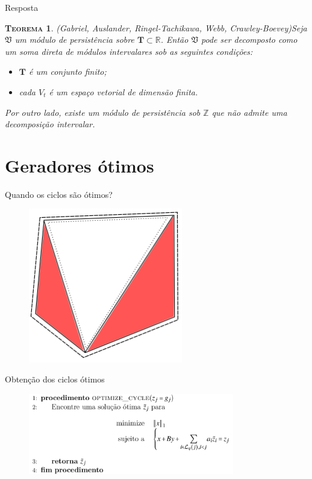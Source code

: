 \documentclass[10pt]{beamer}
\newtheorem{teo}{\scshape Teorema}
\begin{document}
\begin{frame}{Resposta}
    \begin{teo}{(Gabriel, Auslander, Ringel-Tachikawa, Webb, Crawley-Boevey)}\label{teo:crawley}
    Seja $\mathfrak{V}$ um módulo de persistência sobre $\mathbf{T} \subset \mathbb{R}$. Então $\mathfrak{V}$
    pode ser decomposto como um soma direta de módulos intervalares sob as seguintes condições:
    \begin{itemize} 
        \item $\mathbf{T}$ é um conjunto finito;
        \item cada $V_t$ é um espaço vetorial de dimensão finita. 
    \end{itemize}
    Por outro lado, existe um módulo de persistência sob $\mathbb{Z}$ que não admite uma decomposição intervalar. 
\end{teo}  
\end{frame}

\section{Geradores ótimos} 

\begin{frame}{Quando os ciclos são ótimos?}
    \begin{figure}
        \centering
        \includegraphics[width=0.6\textwidth]{images/ciclotimo}
    \end{figure}
\end{frame}

\begin{frame}{Obtenção dos ciclos ótimos}
    \begin{figure}
        \centering
        \includegraphics[width=0.8\textwidth]{images/gerotimo.png}
    \end{figure}
\end{frame}
\end{document}
